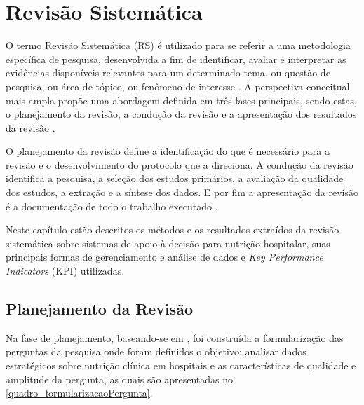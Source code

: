 \chapter{Revisão Sistemática}\label{cap_trabalho_academico}
O termo Revisão Sistemática (RS) é utilizado para se referir a uma metodologia específica de pesquisa, desenvolvida a fim de identificar, avaliar e interpretar as evidências disponíveis relevantes para um determinado tema, ou questão de pesquisa, ou área de tópico, ou fenômeno de interesse \cite{biolchini2005, kitchenham2004}. A perspectiva conceitual mais ampla propõe uma abordagem definida em três fases principais, sendo estas, o planejamento da revisão, a condução da revisão e a apresentação dos resultados da revisão \cite{biolchini2005}. 

O planejamento da revisão define a identificação do que é necessário para a revisão e o desenvolvimento do protocolo que a direciona. A condução da revisão identifica a pesquisa, a seleção dos estudos primários, a avaliação da qualidade dos estudos, a extração e a síntese dos dados. E por fim a apresentação da revisão é a documentação de todo o trabalho executado \cite{kitchenham2004}.

Neste capítulo estão descritos os métodos e os resultados extraídos da revisão sistemática sobre sistemas de apoio à decisão para nutrição hospitalar, suas principais formas de gerenciamento e análise de dados e \textit{Key Performance Indicators} (KPI) utilizadas.

\section{Planejamento da Revisão}

Na fase de planejamento, baseando-se em , foi construída a formularização das perguntas da pesquisa onde foram definidos o objetivo: analisar dados estratégicos sobre nutrição clínica em hospitais e as características de qualidade e amplitude da pergunta, as quais são apresentadas no \autoref{quadro_formularizacaoPergunta}.
\newline
\newline
\newline

